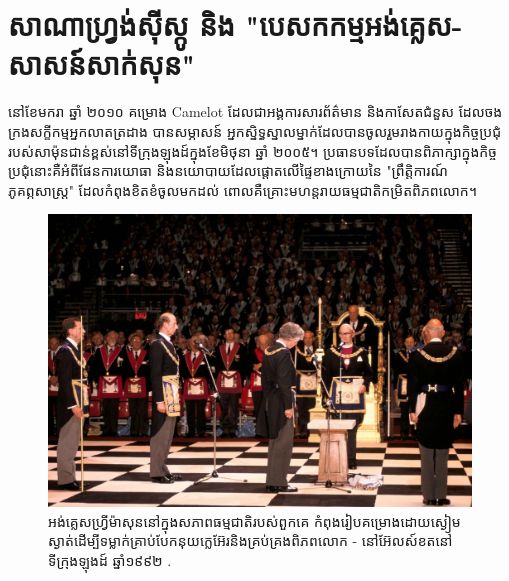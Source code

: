 \documentclass[10pt,twocolumn,letterpaper]{article}
\begin{document}
\section{សាណាហ្វ្រង់ស៊ីស្កូ និង "បេសកកម្មអង់គ្លេស-សាសន៍សាក់សុន"}
នៅខែមករា ឆ្នាំ ២០១០ គម្រោង Camelot ដែលជាអង្គការសារព័ត៌មាន និងកាសែតជំនួស ដែលចងក្រងសក្ខីកម្មអ្នកលាតត្រដាង បានសម្ភាសន៍ \cite{4,6} អ្នកស្និទ្ធស្នាលម្នាក់ដែលបានចូលរួមរាងកាយក្នុងកិច្ចប្រជុំរបស់សាម៉ុនជាន់ខ្ពស់នៅទីក្រុងឡុងដ៍ក្នុងខែមិថុនា ឆ្នាំ ២០០៥។ ប្រធានបទដែលបានពិភាក្សាក្នុងកិច្ចប្រជុំនោះគឺអំពីផែនការយោធា និងនយោបាយដែលផ្តោតលើផ្ទៃខាងក្រោយនៃ "ព្រឹត្តិការណ៍ភូគព្ភសាស្ត្រ" ដែលកំពុងខិតខំចូលមកដល់ ពោលគឺគ្រោះមហន្តរាយធម្មជាតិកម្រិតពិភពលោក។

\begin{figure}[b]
\begin{center}
   \includegraphics[width=1\linewidth]{freemason.jpg}
\end{center}
   \caption{អង់គ្លេសហ្វ្រីម៉ាសុននៅក្នុងសភាពធម្មជាតិរបស់ពួកគេ កំពុងរៀបគម្រោងដោយស្ងៀមស្ងាត់ដើម្បីទម្លាក់គ្រាប់បែកនុយក្លេអ៊ែរនិងគ្រប់គ្រងពិភពលោក - នៅអ៊ែលស៍ខតនៅទីក្រុងឡុងដ៍ ឆ្នាំ១៩៩២ \cite{5}.}
\label{fig:1}
\label{fig:onecol}
\end{figure}
\end{document}
